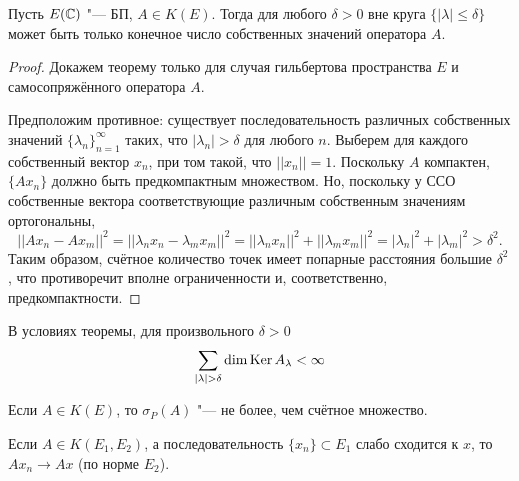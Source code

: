 \documentclass[main]{subfiles}
\begin{document}
\begin{theorem}\label{thm:compact-spectrum-bounds}%
  Пусть \( E(\mathbb{C}) \) "--- БП, \( A \in K(E) \).
  Тогда для любого \( \delta > 0 \) вне круга
  \( \{ |\lambda| \le \delta \} \) может быть
  только конечное число собственных значений оператора \( A \).
\end{theorem}
\begin{proof}
  Докажем теорему только для случая
  гильбертова пространства \( E \)
  и самосопряжённого оператора \( A \).

  Предположим противное: существует последовательность
  различных собственных значений \( \{ \lambda_n \}_{n=1}^\infty \)
  таких, что \( |\lambda_n| > \delta \) для любого \( n \).
  Выберем для каждого собственный вектор \( x_n \),
  при том такой, что \( ||x_n|| = 1 \).
  Поскольку \( A \) компактен,
  \( \{ A x_n \} \) должно быть предкомпактным множеством.
  Но, поскольку у ССО
  собственные вектора соответствующие
  различным собственным значениям
  ортогональны,
  \[
    ||A x_n - A x_m||^2 = ||\lambda_n x_n - \lambda_m x_m||^2 =
    ||\lambda_n x_n||^2 + ||\lambda_m x_m||^2 =
    |\lambda_n|^2 + |\lambda_m|^2 > \delta^2.
  \]
  Таким образом, счётное количество точек
  имеет попарные расстояния большие \( \delta^2 \),
  что противоречит вполне ограниченности и,
  соответственно, предкомпактности.
\end{proof}

\begin{corollary}
  В условиях теоремы, для произвольного \( \delta > 0 \)
  \[
    \sum_{|\lambda| > \delta} \dim \operatorname{Ker} A_\lambda < \infty
  \]
\end{corollary}

\begin{corollary}
  Если \( A \in K(E) \), то \( \sigma_P(A) \) "---
  не более, чем счётное множество.
\end{corollary}

\begin{problem}
  Если \( A \in K(E_1, E_2) \),
  а последовательность \( \{ x_n \} \subset E_1 \)
  слабо сходится к \( x \),
  то \( A x_n \to A x \) (по норме \( E_2 \)).
\end{problem}

\end{document}
